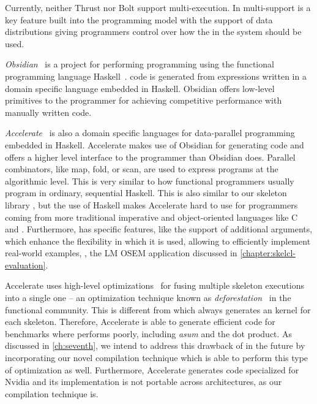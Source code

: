 Currently, neither Thrust nor Bolt support multi-\GPU execution.
In \SkelCL multi-\GPU support is a key feature built into the programming model with the support of data distributions giving programmers control over how the \GPUs in the system should be used.

\bigskip

\emph{Obsidian}~\cite{SvenssonSC08,SvenssonCS10} is a project for performing \GPU programming using the functional programming language Haskell~\cite{HudakPWBFFGHHJKNPP92}.
\GPU code is generated from expressions written in a domain specific language embedded in Haskell.
Obsidian offers low-level primitives to the programmer for achieving competitive performance with manually written \CUDA code.

\bigskip

\emph{Accelerate}~\cite{ChakravartyKLMG11,McDonellCKL13} is also a domain specific languages for data-parallel programming embedded in Haskell.
Accelerate makes use of Obsidian for generating \GPU code and offers a higher level interface to the programmer than Obsidian does.
Parallel combinators, like map, fold, or scan, are used to express programs at the algorithmic level.
This is very similar to how functional programmers usually program in ordinary, sequential Haskell.
This is also similar to our skeleton library \SkelCL, but the use of Haskell makes Accelerate hard to use for programmers coming from more traditional imperative and object-oriented languages like C and \Cpp.
Furthermore, \SkelCL has specific features, like the support of additional arguments, which enhance the flexibility in which it is used, allowing to efficiently implement real-world examples, \eg, the LM OSEM application discussed in \autoref{chapter:skelcl-evaluation}.

Accelerate uses high-level optimizations~\cite{McDonellCKL13} for fusing multiple skeleton executions into a single one -- an optimization technique known as \emph{deforestation}~\cite{Wadler90} in the functional community.
This is different from \SkelCL which always generates an \OpenCL kernel for each skeleton.
Therefore, Accelerate is able to generate efficient code for benchmarks where \SkelCL performs poorly, including \emph{asum} and the dot product.
As discussed in \autoref{ch:seventh}, we intend to address this drawback of \SkelCL in the future by incorporating our novel compilation technique which is able to perform this type of optimization as well.
Furthermore, Accelerate generates \CUDA code specialized for Nvidia \GPUs and its implementation is not portable across architectures, as our compilation technique is.

